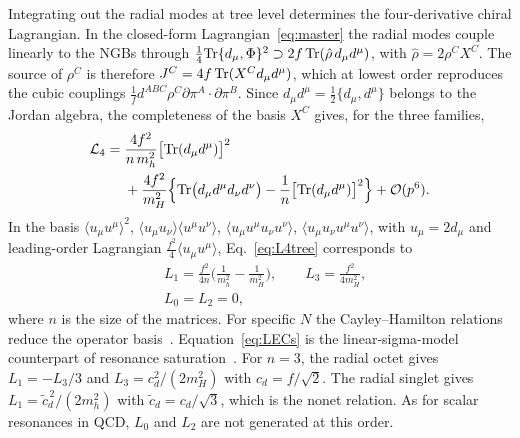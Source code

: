 Integrating out the radial modes at tree level determines the four-derivative chiral Lagrangian. In the closed-form Lagrangian~\eqref{eq:master} the radial modes couple linearly to the NGBs through $\frac14\mathrm{Tr}\{d_\mu,\Phi\}^2\supset 2f\,\mathrm{Tr}(\hat\rho\, d_\mu d^\mu)$, with $\hat\rho=2\rho^CX^C$. The source of $\rho^C$ is therefore $J^C=4f\,\mathrm{Tr}(X^C d_\mu d^\mu)$, which at lowest order reproduces the cubic couplings $\frac1f d^{ABC}\rho^C\partial\pi^A\!\cdot\partial\pi^B$. Since $d_\mu d^\mu=\frac12\{d_\mu,d^\mu\}$ belongs to the Jordan algebra, the completeness of the basis $X^C$ gives, for the three families,
\begin{equation}
\begin{split}
\mathcal L_4={}&\frac{4f^2}{n\,m_h^2}\big[\mathrm{Tr}(d_\mu d^\mu)\big]^2\\
&+\frac{4f^2}{m_H^2}\Big\{\mathrm{Tr}\big(d_\mu d^\mu d_\nu d^\nu\big)-\frac1n\big[\mathrm{Tr}(d_\mu d^\mu)\big]^2\Big\}+\mathcal O(p^6).
\end{split}
\label{eq:L4tree}
\end{equation}
In the basis $\langle u_\mu u^\mu\rangle^2$, $\langle u_\mu u_\nu\rangle\langle u^\mu u^\nu\rangle$, $\langle u_\mu u^\mu u_\nu u^\nu\rangle$, $\langle u_\mu u_\nu u^\mu u^\nu\rangle$, with $u_\mu=2d_\mu$ and leading-order Lagrangian $\frac{f^2}{4}\langle u_\mu u^\mu\rangle$, Eq.~\eqref{eq:L4tree} corresponds to
\begin{equation}
\begin{split}
&L_1=\frac{f^2}{4n}\Big(\frac{1}{m_h^2}-\frac{1}{m_H^2}\Big),\qquad L_3=\frac{f^2}{4m_H^2},\\
&L_0=L_2=0 ,
\end{split}
\label{eq:LECs}
\end{equation}
where $n$ is the size of the matrices. For specific $N$ the Cayley--Hamilton relations reduce the operator basis~\cite{Bijnens:2009qm,Bijnens:2011fm}. Equation~\eqref{eq:LECs} is the linear-sigma-model counterpart of resonance saturation~\cite{Ecker:1988te}. For $n=3$, the radial octet gives $L_1=-L_3/3$ and $L_3=c_d^2/(2m_H^2)$ with $c_d=f/\sqrt2$. The radial singlet gives $L_1=\tilde c_d^{\,2}/(2m_h^2)$ with $\tilde c_d=c_d/\sqrt3$, which is the nonet relation. As for scalar resonances in QCD, $L_0$ and $L_2$ are not generated at this order.

